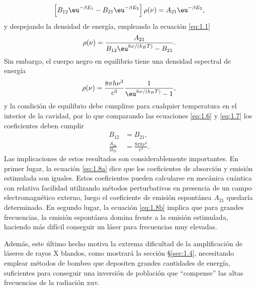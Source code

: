 \begin{equation}\label{eq:1.5}
  \left[B_{12}\eu^{-\beta E_{1}}-B_{21}\eu^{-\beta E_{2}}\right] \rho(\nu) = A_{21}\eu^{-\beta E_{2}},
\end{equation}
y despejando la densidad de energía, empleando la ecuación \eqref{eq:1.1}
\begin{equation}\label{eq:1.6}
  \rho(\nu) = \frac{A_{21}}{B_{12}\eu^{h \nu/(k_{B}T)} - B_{21}}.
\end{equation}
Sin embargo, el cuerpo negro en equilibrio tiene una densidad espectral de energía \autocite{Feynman2011}
\begin{equation}\label{eq:1.7}
  \rho(\nu) = \frac{8 \pi h \nu^{3}}{c^{3}}\frac{1}{\eu^{h \nu/(k_{B}T)} - 1},
\end{equation}
y la condición de equilibrio debe cumplirse para cualquier temperatura en el interior de la cavidad, por lo que comparando las ecuaciones \eqref{eq:1.6} y \eqref{eq:1.7} los coeficientes deben cumplir
\begin{align}
  \label{eq:1.8a}
  B_{12} &= B_{21}, \\
  \label{eq:1.8b}
  \frac{A_{21}}{B_{21}} &= \frac{8 \pi h \nu^{3}}{c^{3}}.
\end{align}
Las implicaciones de estos resultados son considerablemente importantes. En primer lugar, la ecuación \eqref{eq:1.8a} dice que los coeficientes de absorción y emisión estimulada son iguales. Estos coeficientes pueden calcularse en mecánica cuántica \autocite{Sakurai2020} con relativa facilidad utilizando métodos perturbativos en presencia de un campo electromagnético externo, luego el coeficiente de emisión espontánea $A_{21}$ quedaría determinado. En segundo lugar, la ecuación \eqref{eq:1.8b} implica que para grandes frecuencias, la emisión espontánea domina frente a la emisión estimulada, haciendo más difícil conseguir un láser para frecuencias muy elevadas. 

Además, este último hecho motiva la extrema dificultad de la amplificación de láseres de rayos X blandos, como mostrará la sección \S\ref{sec:1.4}, necesitando emplear métodos de bombeo que depositen grandes cantidades de energía, suficientes para conseguir una inversión de población que \enquote{compense} las altas frecuencias de la radiación \acrshort{xuv}. 

